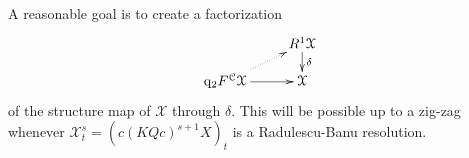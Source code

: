 \documentclass[11pt]{amsart} \renewcommand{\baselinestretch}{1.4}
\theoremstyle{plain}
\theoremstyle{definition}
\renewcommand{\to}{\longrightarrow}
\newcommand{\from}{\longleftarrow}
\newcommand{\frakt}{\mathfrak{t}}
\newcommand{\fraks}{\mathfrak{s}}
\newcommand{\calx}{\mathcal{X}}
\newcommand{\calc}{\mathcal{C}}
\newcommand{\quadgrad}[1]{\mathrm{q}_{#1}}
\newcommand{\Dendo}{R}
\begin{document}
\begin{Operations on the Bousfield-Kan spectral sequence}
A reasonable goal is to create a factorization
\[\xymatrix@R=4mm{
&%
\Dendo^1\calx\ar[d]^-{\delta}
\\%
\quadgrad{2}F^{\calc}\calx\ar@{..>}[ur]
\ar[r]
&%
\calx%
}\]
of the structure map of $\calx$ through $\delta$. This will be possible up to a zig-zag whenever $\calx^s_t=(c(KQc)^{s+1}X)_t$ is a  Radulescu-Banu resolution. 
%
%
%
%





\end{Operations on the Bousfield-Kan spectral sequence}
\end{document}
